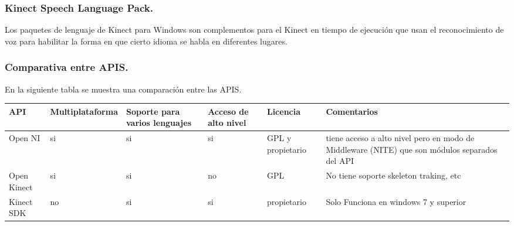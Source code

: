 \documentclass[11pt,a4paper]{article}
\begin{document}
\subsubsection{Kinect Speech Language Pack.}
Los paquetes de lenguaje de Kinect para Windows son complementos para el Kinect en tiempo de ejecución que usan el reconocimiento de voz para habilitar la forma en que cierto idioma se habla en diferentes lugares.
\subsubsection{Comparativa entre APIS.}
En la siguiente tabla se muestra una comparación entre las APIS.
\begin{table}[h]
\centering
\begin{tabular}{||p{2cm}||p{2.6cm}||p{2cm}||p{2cm}||p{2cm}||p{3cm}||}
\hline API         & Multiplataforma & Soporte para varios lenguajes & Acceso de alto nivel & Licencia & Comentarios \\ 
\hline Open NI     & si & si & si & GPL y propietario & tiene acceso a alto nivel pero en modo de Middleware (NITE) que son módulos separados del API\\ 
\hline Open Kinect & si & si & no & GPL & No tiene soporte skeleton traking, etc \\ 
\hline Kinect SDK  & no & si & si & propietario & Solo Funciona en windows 7 y superior \\ 
\hline
\end{tabular}
\end{table}
\end{document}

